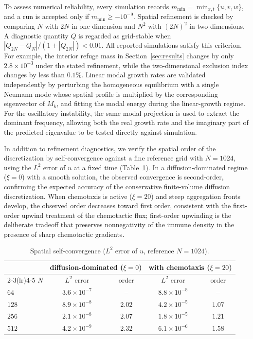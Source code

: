 \documentclass[]{interact}
\theoremstyle{plain}%
\theoremstyle{definition}
\theoremstyle{remark}
\begin{document}
To assess numerical reliability, every simulation records
$m_{\min}=\min_{x,t}\{u,v,w\}$,
and a run is accepted only if $m_{\min}\ge-10^{-9}$. Spatial refinement is
checked by comparing $N$ with $2N$ in one dimension and $N^2$ with $(2N)^2$ in
two dimensions. A diagnostic quantity $Q$ is regarded as grid-stable when
$|Q_{2N}-Q_N|/(1+|Q_{2N}|)<0.01$.
All reported simulations satisfy this criterion. For example, the interior
refuge mass in Section~\ref{sec:results} changes by only
$2.8\times10^{-3}$ under the stated refinement, while the two-dimensional
exclusion index changes by less than $0.1\%$. Linear modal growth rates are
validated independently by perturbing the homogeneous equilibrium with a single
Neumann mode whose spatial profile is multiplied by the corresponding
eigenvector of $M_k$, and fitting the modal energy during the linear-growth
regime. For the oscillatory instability, the same modal projection is used to
extract the dominant frequency, allowing both the real growth rate and the
imaginary part of the predicted eigenvalue to be tested directly against
simulation.

In addition to refinement diagnostics, we verify the spatial order of the
discretization by self-convergence against a fine reference grid with
$N=1024$, using the $L^2$ error of $u$ at a fixed time
(Table~\ref{tab:convergence}). In a diffusion-dominated regime
($\xi=0$) with a smooth solution, the observed convergence is second-order,
confirming the expected accuracy of the conservative finite-volume diffusion
discretization. When chemotaxis is active ($\xi=20$) and steep aggregation
fronts develop, the observed order decreases toward first order, consistent
with the first-order upwind treatment of the chemotactic flux; first-order upwinding is the deliberate tradeoff that preserves nonnegativity of the immune density in the presence of sharp chemotactic gradients.

\begin{table}[htbp]
\centering
\caption{Spatial self-convergence ($L^2$ error of $u$, reference $N=1024$).}
\label{tab:convergence}
\renewcommand{\arraystretch}{1.15}
\begin{tabular}{lcccc}
\toprule
& \multicolumn{2}{c}{diffusion-dominated ($\xi=0$)}
& \multicolumn{2}{c}{with chemotaxis ($\xi=20$)}\\
\cmidrule(lr){2-3}\cmidrule(lr){4-5}
$N$ & $L^2$ error & order & $L^2$ error & order\\
\midrule
$64$  & $3.6\times10^{-7}$ & --   & $8.8\times10^{-5}$ & --\\
$128$ & $8.9\times10^{-8}$ & $2.02$ & $4.2\times10^{-5}$ & $1.07$\\
$256$ & $2.1\times10^{-8}$ & $2.07$ & $1.8\times10^{-5}$ & $1.21$\\
$512$ & $4.2\times10^{-9}$ & $2.32$ & $6.1\times10^{-6}$ & $1.58$\\
\bottomrule
\end{tabular}
\end{table}
\end{document}
